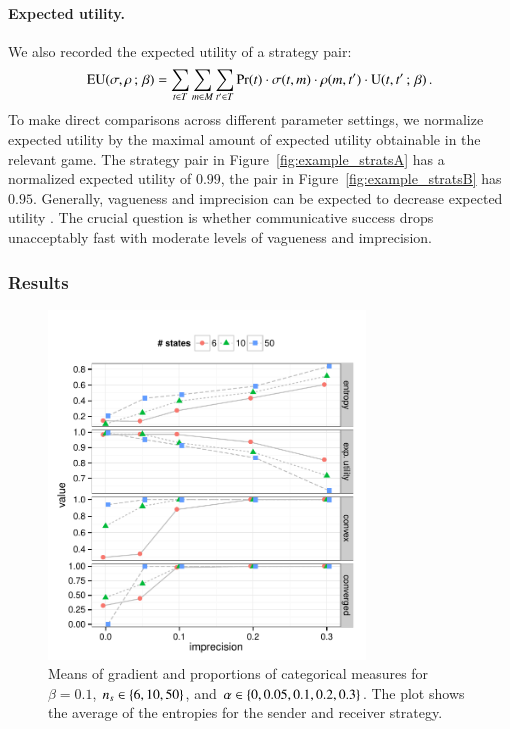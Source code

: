 \documentclass[fleqn,reqno,10pt]{article}
\newcommand{\imprecision}{\ensuremath{\alpha}} %
\newcommand{\toler}{\ensuremath{\beta}} %
\newcommand{\ns}{\ensuremath{n_s}} %
\begin{document}
\paragraph{Expected utility.} We also recorded the expected utility of
a strategy pair:
\begin{align*}
  \EU(\Sstrat,\Rstrat \myts ; \myts \toler) = \sum_{\state \in
    \States} \sum_{\messg \in \Messgs} \sum_{\state' \in \States}
  \Pr(\state) \cdot \Sstrat(\state, \messg) \cdot \Rstrat(\messg,
  \state') \cdot \Util(\state,\state' \myts ; \myts \toler)\,.
\end{align*}
To make direct comparisons across different parameter settings, we
normalize expected utility by the maximal amount of expected utility
obtainable in the relevant game. The strategy pair in
Figure~\ref{fig:example_stratsA} has a normalized expected utility of
$0.99$, the pair in Figure~\ref{fig:example_stratsB} has
$0.95$. Generally, vagueness and imprecision can be expected to
decrease expected utility
\citep[c.f.][]{Lipman2009:Why-is-Language}. The crucial question is
whether communicative success drops unacceptably fast with moderate
levels of vagueness and imprecision.

\subsubsection{Results}

\begin{figure}[t]
  \centering
  
  \includegraphics[width=0.75\textwidth]{plots/MeanMetrics3.pdf}

  \caption{Means of gradient and proportions of categorical measures
    for $\toler = 0.1$, $\ns \in \set{6, 10, 50}$, and $\imprecision
    \in \set{0, 0.05, 0.1, 0.2, 0.3}$. The plot shows the average of
    the entropies for the sender and receiver strategy.}
  \label{fig:MeanMetrics}
\end{figure}
\end{document}
